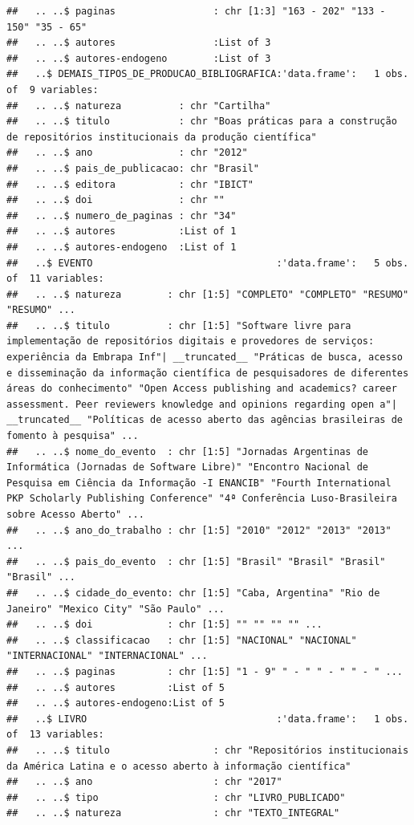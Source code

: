 \documentclass[]{article}
\begin{document}
\begin{verbatim}
##   .. ..$ paginas                 : chr [1:3] "163 - 202" "133 - 150" "35 - 65"
##   .. ..$ autores                 :List of 3
##   .. ..$ autores-endogeno        :List of 3
##   ..$ DEMAIS_TIPOS_DE_PRODUCAO_BIBLIOGRAFICA:'data.frame':   1 obs. of  9 variables:
##   .. ..$ natureza          : chr "Cartilha"
##   .. ..$ titulo            : chr "Boas práticas para a construção de repositórios institucionais da produção científica"
##   .. ..$ ano               : chr "2012"
##   .. ..$ pais_de_publicacao: chr "Brasil"
##   .. ..$ editora           : chr "IBICT"
##   .. ..$ doi               : chr ""
##   .. ..$ numero_de_paginas : chr "34"
##   .. ..$ autores           :List of 1
##   .. ..$ autores-endogeno  :List of 1
##   ..$ EVENTO                                :'data.frame':   5 obs. of  11 variables:
##   .. ..$ natureza        : chr [1:5] "COMPLETO" "COMPLETO" "RESUMO" "RESUMO" ...
##   .. ..$ titulo          : chr [1:5] "Software livre para implementação de repositórios digitais e provedores de serviços: experiência da Embrapa Inf"| __truncated__ "Práticas de busca, acesso e disseminação da informação científica de pesquisadores de diferentes áreas do conhecimento" "Open Access publishing and academics? career assessment. Peer reviewers knowledge and opinions regarding open a"| __truncated__ "Políticas de acesso aberto das agências brasileiras de fomento à pesquisa" ...
##   .. ..$ nome_do_evento  : chr [1:5] "Jornadas Argentinas de Informática (Jornadas de Software Libre)" "Encontro Nacional de Pesquisa em Ciência da Informação -I ENANCIB" "Fourth International PKP Scholarly Publishing Conference" "4ª Conferência Luso-Brasileira sobre Acesso Aberto" ...
##   .. ..$ ano_do_trabalho : chr [1:5] "2010" "2012" "2013" "2013" ...
##   .. ..$ pais_do_evento  : chr [1:5] "Brasil" "Brasil" "Brasil" "Brasil" ...
##   .. ..$ cidade_do_evento: chr [1:5] "Caba, Argentina" "Rio de Janeiro" "Mexico City" "São Paulo" ...
##   .. ..$ doi             : chr [1:5] "" "" "" "" ...
##   .. ..$ classificacao   : chr [1:5] "NACIONAL" "NACIONAL" "INTERNACIONAL" "INTERNACIONAL" ...
##   .. ..$ paginas         : chr [1:5] "1 - 9" " - " " - " " - " ...
##   .. ..$ autores         :List of 5
##   .. ..$ autores-endogeno:List of 5
##   ..$ LIVRO                                 :'data.frame':   1 obs. of  13 variables:
##   .. ..$ titulo                  : chr "Repositórios institucionais da América Latina e o acesso aberto à informação científica"
##   .. ..$ ano                     : chr "2017"
##   .. ..$ tipo                    : chr "LIVRO_PUBLICADO"
##   .. ..$ natureza                : chr "TEXTO_INTEGRAL"

\end{verbatim}
\end{document}
